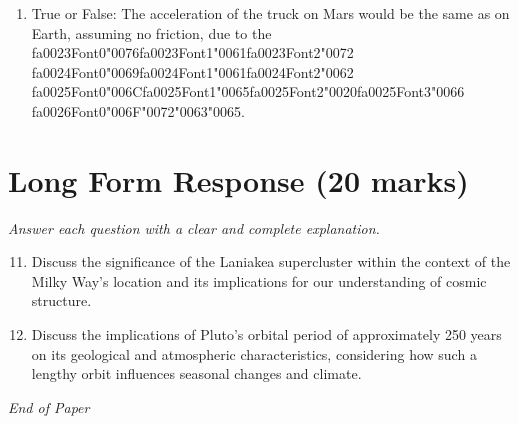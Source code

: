 \documentclass[12pt]{article}
\begin{document}
\begin{enumerate}[label=\arabic*.]
\item True or False: The acceleration of the truck on Mars would be the same as on Earth, assuming no friction, due to the {\csname fa0023Font0\endcsname\char"0076}{\csname fa0023Font1\endcsname\char"0061}{\csname fa0023Font2\endcsname\char"0072} {\csname fa0024Font0\endcsname\char"0069}{\csname fa0024Font1\endcsname\char"0061}{\csname fa0024Font2\endcsname\char"0062} {\csname fa0025Font0\endcsname\char"006C}{\csname fa0025Font1\endcsname\char"0065}{\csname fa0025Font2\endcsname\char"0020}{\csname fa0025Font3\endcsname\char"0066} {\csname fa0026Font0\endcsname\char"006F}{\char"0072}{\char"0063}{\char"0065}.
\end{enumerate}

\section*{Long Form Response (20 marks)}
\textit{Answer each question with a clear and complete explanation.}
\begin{enumerate}[label=\arabic*.]
\setcounter{enumi}{10}
\item Discuss the significance of the Laniakea supercluster within the context of the Milky
Way's location and its implications for our understanding of cosmic structure.
\item Discuss the implications of Pluto's orbital period of approximately 250 years on its
geological and atmospheric characteristics, considering how such a lengthy orbit
influences seasonal changes and climate.
\end{enumerate}

\vfill
\noindent\textit{End of Paper}
\end{document}

